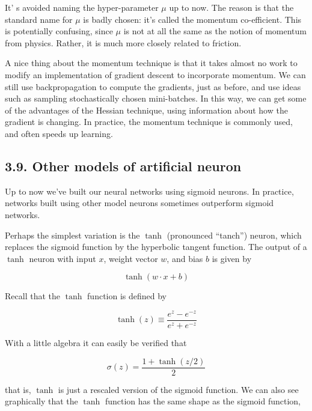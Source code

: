 \documentclass[12 pt]{article}
\begin{document}
It' s avoided naming the hyper-parameter $ \mu $ up to now. The reason
is that the standard name for $ \mu $ is badly chosen: it's called the
momentum co-efficient. This is potentially confusing, since $ \mu $ is
not at all the same as the notion of momentum from physics. Rather, it
is much more closely related to friction.

A nice thing about the momentum technique is that it takes almost no
work to modify an implementation of gradient descent to incorporate
momentum. We can still use backpropagation to compute the gradients,
just as before, and use ideas such as sampling stochastically chosen
mini-batches. In this way, we can get some of the advantages of the
Hessian technique, using information about how the gradient is changing.
In practice, the momentum technique is commonly used, and often speeds
up learning.

\subsection{3.9. Other models of artificial neuron}
\label{other-models-of-artificial-neuron}

Up to now we've built our neural networks using sigmoid neurons. In
practice, networks built using other model neurons sometimes outperform
sigmoid networks.

Perhaps the simplest variation is the $ \tanh $ (pronounced ``tanch'')
neuron, which replaces the sigmoid function by the hyperbolic tangent
function. The output of a $ \tanh $ neuron with input $ x
$, weight vector $ w $, and bias $ b $ is given by

\begin{equation}
    \tanh(w \cdot x + b)
\end{equation}

Recall that the $ \tanh $ function is defined by

\begin{equation}
    \tanh(z) \equiv \frac{e^z − e^{-z}}{e^z + e^{-z}}
\end{equation}

With a little algebra it can easily be verified that

\begin{equation}
    \sigma(z) = \frac{1 + \tanh(z / 2)}{2}
\end{equation}

that is, $ \tanh $ is just a rescaled version of the sigmoid function.
We can also see graphically that the $ \tanh $ function has the same
shape as the sigmoid function,
\end{document}
